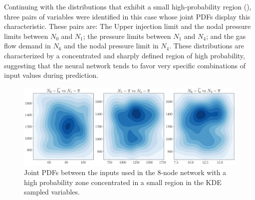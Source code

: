 Continuing with the distributions that exhibit a small high-probability region (), three pairs of variables were identified in this case whose joint PDFs display this characteristic. These pairs are: The Upper injection limit and the nodal pressure limits between $N_0$ and $N_1$; the pressure limits between $N_1$ and $N_4$; and the gas flow demand in $N_6$ and the nodal pressure limit in $N_4$. These distributions are characterized by a concentrated and sharply defined region of high probability, suggesting that the neural network tends to favor very specific combinations of input values during prediction. 

\begin{figure}[htbp]
    \begin{center}
        \includegraphics[width=.75\textwidth]{figures/Chapter_NonLinealCensnet/PDF_inputs_inputs_no_mode (KDE).png}
    \end{center}
    \caption{Joint PDFs between the inputs used in the 8-node network with a high probability zone concentrated in a small region in the KDE sampled variables.}
    \label{fig:joint_distributions_input_input_no_mode_KDE}
\end{figure}



